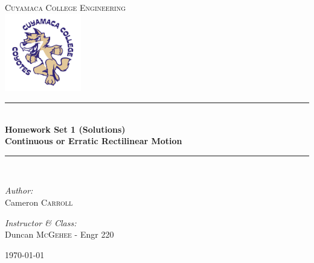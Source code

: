 \documentclass[11pt,letterpaper]{report}
\newcommand{\HRule}{\rule{\linewidth}{0.5mm}}
\begin{document}
\begin{titlepage}
\begin{center}

\textsc{\Large Cuyamaca College Engineering}\\[0.5cm]
\includegraphics[width=0.25\textwidth]{./clogo.jpg}

\HRule \\[0.4cm]
{ \LARGE \bfseries Homework Set 1 (Solutions)}\\[0.5cm]
{ \large \bfseries Continuous or Erratic Rectilinear Motion}\\[0.5cm]

\HRule \\[1.5cm]

\begin{minipage}{0.4\textwidth}
\begin{flushleft} \large
\emph{Author:}\\
Cameron \textsc{Carroll}\\[0.2cm]

\end{flushleft}
\end{minipage}
\begin{minipage}{0.4\textwidth}
\begin{flushright} \large
\emph{Instructor \& Class:}\\
Duncan \textsc{McGehee} - Engr 220
\end{flushright}
\end{minipage}

\vfill

{\large \today}

\end{center}
\end{titlepage}
\end{document}
